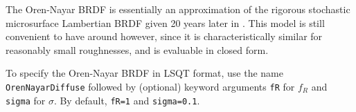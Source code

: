 \documentclass[
    twoside,
    twocolumn,
    letterpaper,
    10pt]{article}
\newcommand\namett[2]{{\color{code#1}\texttt{#2}}}
\begin{document}
The Oren-Nayar BRDF is essentially an approximation of the
rigorous stochastic microsurface Lambertian BRDF given 20 years 
later in \cite{Heitz:16}.  This model is still convenient to have 
around however, since it is characteristically similar for 
reasonably small roughnesses, and is evaluable in closed form.

To specify the Oren-Nayar BRDF in LSQT format, use the name
\namett{purple}{OrenNayarDiffuse} followed by (optional) keyword 
arguments \texttt{fR} for $f_R$ and \texttt{sigma} for $\sigma$.
By default, \texttt{fR=1} and \texttt{sigma=0.1}.

{
\nocite{Goodenough:17}
\raggedright
\printbibliography
}
\end{document}
